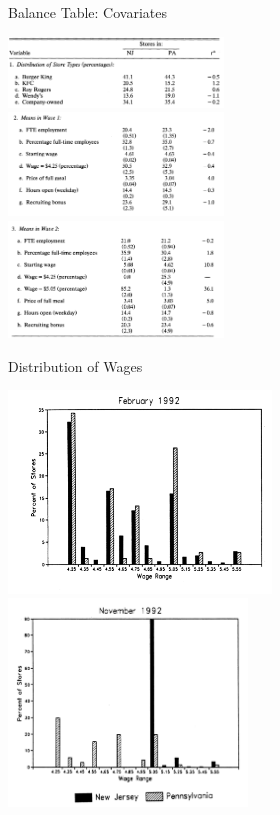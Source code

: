 \begin{frame}{Balance Table: Covariates}
\begin{center}
\includegraphics[width=2.25in]{./resources/ck_tab2b.png}\\
\includegraphics[width=2.25in]{./resources/ck_tab2c.png}\\
\includegraphics[width=2.25in]{./resources/ck_tab2a.png}
\end{center}
\end{frame}



\begin{frame}{Distribution of Wages}
\begin{center}
\includegraphics[width=2.75in]{./resources/ck_fig1b.png}
\includegraphics[width=2.5in]{./resources/ck_fig1a.png}
\end{center}
\end{frame}


